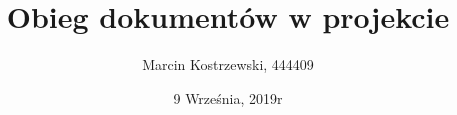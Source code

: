 \documentclass{article}
\title{Obieg dokumentów w projekcie}
\author{Marcin Kostrzewski, 444409}
\date{9 Września, 2019r}
\begin{document}
\maketitle
\newpage
\
\end{document}
